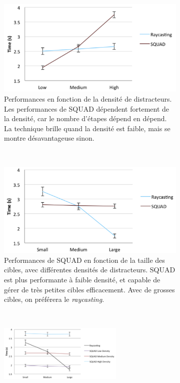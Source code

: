 	\begin{figure}[!htbp]
		\begin{subfigure}[t]{0.49\textwidth}
			\centering
			\includegraphics[width=\textwidth]{figures/ch2/squadDensity}
			\caption{Performances en fonction de la densité de distracteurs. Les performances de SQUAD dépendent fortement de la densité, car le nombre d'étapes dépend en dépend. La technique brille quand la densité est faible, mais se montre désavantageuse sinon.}
			\label{fig:squadDensity}
		\end{subfigure}
		~
		\begin{subfigure}[t]{0.49\textwidth}
			\centering
			\includegraphics[width=\textwidth]{figures/ch2/squadSize}
			\caption{Performances de SQUAD en fonction de la taille des cibles, avec différentes densités de distracteurs. SQUAD est plus performante à faible densité, et capable de gérer de très petites cibles efficacement. Avec de grosses cibles, on préférera le \emph{raycasting}.}
			\label{fig:squadSize}
		\end{subfigure}
		~
		\begin{center}
			\begin{subfigure}[t]{\textwidth}
				\centering
				\includegraphics[width=0.65\textwidth]{figures/ch2/squadRecap}

\end{subfigure}
\end{center}
\end{figure}
